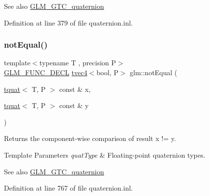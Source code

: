 \begin{DoxySeeAlso}{See also}
\mbox{\hyperlink{group__gtc__quaternion}{G\+L\+M\+\_\+\+G\+T\+C\+\_\+quaternion}} 
\end{DoxySeeAlso}


Definition at line 379 of file quaternion.\+inl.

\mbox{\label{group__gtc__quaternion_ga484c4633f7c05d8e29ee8b452350f539}} 
\subsubsection{\texorpdfstring{notEqual()}{notEqual()}}
{\footnotesize\ttfamily template$<$typename T , precision P$>$ \\
\mbox{\hyperlink{setup_8hpp_ab2d052de21a70539923e9bcbf6e83a51}{G\+L\+M\+\_\+\+F\+U\+N\+C\+\_\+\+D\+E\+CL}} \mbox{\hyperlink{structglm_1_1tvec4}{tvec4}}$<$bool, P$>$ glm\+::not\+Equal (\begin{DoxyParamCaption}\item[{\mbox{\hyperlink{structglm_1_1tquat}{tquat}}$<$ T, P $>$ const \&}]{x,  }\item[{\mbox{\hyperlink{structglm_1_1tquat}{tquat}}$<$ T, P $>$ const \&}]{y }\end{DoxyParamCaption})}

Returns the component-\/wise comparison of result x != y.


\begin{DoxyTemplParams}{Template Parameters}
{\em quat\+Type} & Floating-\/point quaternion types.\\
\hline
\end{DoxyTemplParams}
\begin{DoxySeeAlso}{See also}
\mbox{\hyperlink{group__gtc__quaternion}{G\+L\+M\+\_\+\+G\+T\+C\+\_\+quaternion}} 
\end{DoxySeeAlso}


Definition at line 767 of file quaternion.\+inl.

\mbox{\label{group__gtc__quaternion_ga34388abcfaea2b9328538c35fad4cceb}} 
